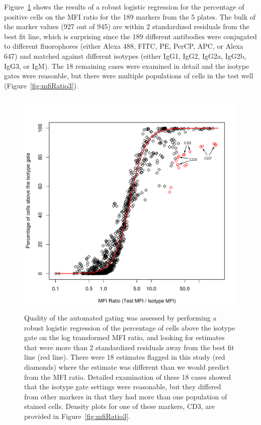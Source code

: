 \documentclass[12pt]{article}
\begin{document}
Figure~\ref{fig:mfiRatio} shows the results of a robust logistic regression for
the percentage of positive cells on the MFI ratio for the 189 markers
from the 5 plates. The bulk of the marker values (927 out of 945) are within 2
standardized residuals from the best fit line, which is surprising since the 189
different antibodies were conjugated to different fluorophores (either Alexa
488, FITC, PE, PerCP, APC, or Alexa 647) and matched against different isotypes
(either IgG1, IgG2, IgG2a, IgG2b, IgG3, or IgM). The 18 remaining cases were
examined in detail and the isotype gates were reasonble, but there were
multiple populations of cells in the test well (Figure~\ref{fig:mfiRatio3}). 

\begin{figure}
\centering
\includegraphics{mfiRatioB.pdf}
\caption{Quality of the automated gating was assessed by performing a robust
logistic regression of the percentage of cells above the isotype gate on the
log transformed MFI ratio, and looking for estimates that were more than 2
standardized residuals away from the best fit line (red line). There were 18
estimates flagged in this study (red diamonds) where the estimate was different
than we would predict from the MFI ratio. Detailed examination of these 18
cases showed that the isotype gate settings were reasonable, but they differed
from other markers in that they had more than one population of stained cells.
Density plots for one of these markers, CD3, are provided in
Figure~\ref{fig:mfiRatio3}.
}
\label{fig:mfiRatio}
\end{figure}
\end{document}
